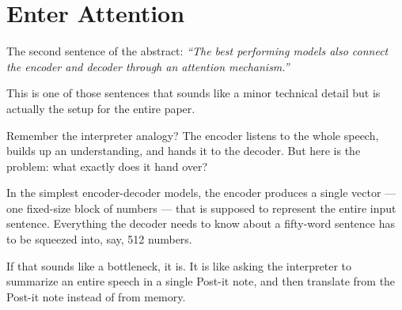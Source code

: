 \section{Enter Attention}

The second sentence of the abstract: \emph{``The best performing models also connect the encoder and decoder through an attention mechanism.''}

This is one of those sentences that sounds like a minor technical detail but is actually the setup for the entire paper.

Remember the interpreter analogy?
The encoder listens to the whole speech, builds up an understanding, and hands it to the decoder.
But here is the problem: what exactly does it hand over?

In the simplest encoder-decoder models, the encoder produces a single vector --- one fixed-size block of numbers --- that is supposed to represent the entire input sentence.
Everything the decoder needs to know about a fifty-word sentence has to be squeezed into, say, 512 numbers.

If that sounds like a bottleneck, it is.
It is like asking the interpreter to summarize an entire speech in a single Post-it note, and then translate from the Post-it note instead of from memory.

